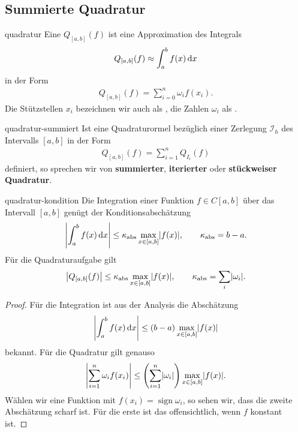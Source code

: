 \subsection{Summierte Quadratur}

\begin{Definition}{quadratur}
  Eine  $Q_{[a,b]}(f)$ ist eine Approximation
  des Integrals
  \begin{gather}
    Q_{[a,b]}(f) \approx \int_a^b f(x)\,\mathrm{d} x
  \end{gather}
  in der Form
  \begin{gather}
    Q_{[a,b]}(f) = \sum_{i=0}^n \omega_i f(x_i).
  \end{gather}
  Die Stützstellen $x_i$ bezeichnen wir auch als
  , die Zahlen $\omega_i$ als
  .
\end{Definition}

\begin{Definition}{quadratur-summiert}
  Ist eine Quadraturormel bezüglich einer Zerlegung
  $\mathcal I_h$ des Intervalls $[a,b]$ in der Form
  \begin{gather}
    Q_{[a,b]}(f) = \sum_{i=1}^n Q_{I_i} (f)
  \end{gather}
  definiert, so sprechen wir von \textbf{summierter},
  \textbf{iterierter} oder \textbf{stückweiser Quadratur}.
\end{Definition}

\begin{Satz}{quadratur-kondition}
  Die Integration einer Funktion $f\in C[a,b]$ über das Intervall $[a,b]$ genügt der Konditionsabschätzung
  \begin{gather}
    \left|\int_a^b f(x)\,\mathrm{d} x \right| \le \kappa_{\text{abs}} \max_{x\in[a,b]}\lvert f(x)\rvert,
    \qquad \kappa_{\text{abs}} = b-a.
  \end{gather}
  Für die Quadraturaufgabe gilt
  \begin{gather}
    \left| Q_{[a,b]}(f)\right| \le \kappa_{\text{abs}} \max_{x\in[a,b]}\lvert f(x)\rvert,
    \qquad \kappa_{\text{abs}} = \sum_i \lvert\omega_i\rvert.
  \end{gather}
\end{Satz}

\begin{proof}
  Für die Integration ist aus der Analysis die Abschätzung
  \begin{gather}
    \left|\int_a^b f(x)\,\mathrm{d} x\right| \le (b-a) \max_{x\in[a,b]}\lvert f(x)\rvert
  \end{gather}
  bekannt.
  Für die Quadratur gilt genauso
  \begin{gather}
    \left|\sum_{i=1}^n \omega_i f(x_i)\right|
    \le \left(\sum_{i=1}^n \lvert\omega_i\rvert\right) \max_{x\in[a,b]}\lvert f(x)\rvert.
  \end{gather}
  Wählen wir eine Funktion mit
  $f(x_i) = \operatorname{sign} \omega_i$, so sehen wir, dass die
  zweite Abschätzung scharf ist. Für die erste ist das offensichtlich,
  wenn $f$ konstant ist.
\end{proof}

